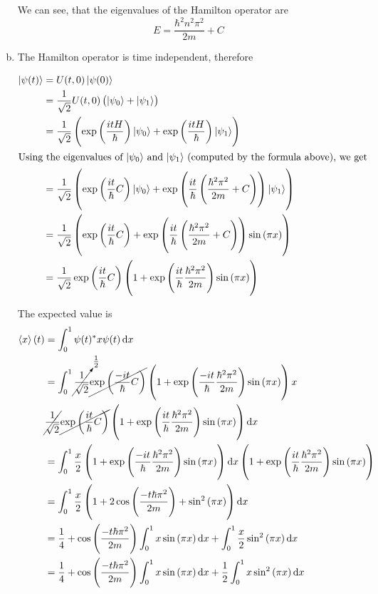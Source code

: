 \documentclass[a4paper,german,12pt,smallheadings]{scrartcl}
\begin{document}
\begin{enumerate}[a)]
    We can see, that the eigenvalues of the Hamilton operator are
    \begin{equation*}
      E = \frac{\hbar^2 n^2 \pi^2}{2m} + C
    \end{equation*}

  \item
    The Hamilton operator is time independent, therefore

    \begin{align*}
      \ket{\psi(t)} &= U(t,0) \ket{\psi(0)} \\
                    &= \frac{1}{\sqrt{2}} U(t,0) \del{\ket{\psi_0} + \ket{\psi_1}} \\
                    &= \frac{1}{\sqrt{2}} \del{\exp\del{\frac{itH}{\hbar}} \ket{\psi_0} + \exp\del{\frac{itH}{\hbar}} \ket{\psi_1}} \\
      \intertext{Using the eigenvalues of $\ket{\psi_0}$ and $\ket{\psi_1}$ (computed by the formula above), we get}
      &= \frac{1}{\sqrt{2}} \del{\exp\del{\frac{it}{\hbar} C} \ket{\psi_0} + \exp\del{\frac{it}{\hbar} \del{\frac{\hbar^2 \pi^2}{2m} + C}} \ket{\psi_1}} \\
      &= \frac{1}{\sqrt{2}} \del{\exp\del{\frac{it}{\hbar} C} + \exp\del{\frac{it}{\hbar} \del{\frac{\hbar^2 \pi^2}{2m} + C}} \sin\del{\pi x}} \\
      &= \frac{1}{\sqrt{2}} \exp\del{\frac{it}{\hbar} C} \del{1 + \exp\del{\frac{it}{\hbar} \frac{\hbar^2 \pi^2}{2m}} \sin\del{\pi x}} \\
    \end{align*}

    The expected value is
    \begin{align*}
      \braket{x}(t) &= \int_{0}^{1} \psi(t)^* x \psi(t) \dif x \\
                    &= \int_{0}^{1}
      \cancelto{\frac{1}{2}}{\frac{1}{\sqrt{2}}} \cancel{\exp\del{\frac{-it}{\hbar} C}} \del{1 + \exp\del{\frac{-it}{\hbar} \frac{\hbar^2 \pi^2}{2m}} \sin\del{\pi x}}
                       x \\
                       &\cancel{\frac{1}{\sqrt{2}}} \cancel{\exp\del{\frac{it}{\hbar} C}} \del{1 + \exp\del{\frac{it}{\hbar} \frac{\hbar^2 \pi^2}{2m}} \sin\del{\pi x}}
                        \dif x \\
                    &=
                       \int_0^1 \frac{x}{2} \del{1 + \exp\del{\frac{-it}{\hbar} \frac{\hbar^2 \pi^2}{2m}} \sin\del{\pi x}} \dif x
                       \del{1 + \exp\del{\frac{it}{\hbar} \frac{\hbar^2 \pi^2}{2m}} \sin\del{\pi x}} \\
                       &= \int_0^1 \frac{x}{2}\del{1 + 2\cos\del{\frac{-t \hbar \pi^2}{2m}} + \sin^2\del{\pi x}} \dif x \\
                       &= \frac{1}{4} + \cos\del{\frac{-t \hbar \pi^2}{2m}} \int_0^1 x \sin\del{\pi x} \dif x + \int_0^1 \frac{x}{2} \sin^2\del{\pi x} \dif x\\
                       &= \frac{1}{4} + \cos\del{\frac{-t \hbar \pi^2}{2m}} \int_0^1 x \sin\del{\pi x} \dif x + \frac{1}{2} \int_0^1 x \sin^2\del{\pi x} \dif x\\
    \end{align*}


\end{enumerate}
\end{document}
